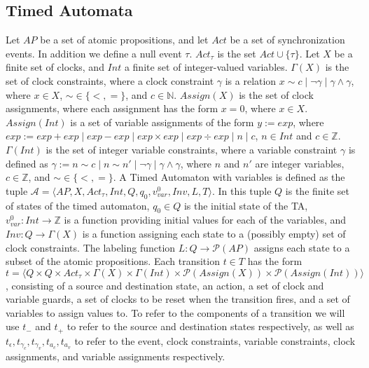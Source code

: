 \documentclass[a4paper,12pt]{article}
\newcommand*\BitOr{\mathbin{|}}
\begin{document}
\subsection{Timed Automata}\label{timed-automata}
Let \(AP\) be a set of atomic propositions, and let \(Act\) be a set of
synchronization events. In addition we define a null event \(\tau\).
\(Act_{\tau}\) is the set \(Act \cup \{\tau\}\). Let \(X\) be a finite set of
clocks, and \(Int\) a finite set of integer-valued variables. \(\Gamma(X)\) is
the set of clock constraints, where a clock constraint \(\gamma\) is a relation
\(x \sim c \BitOr \neg \gamma\BitOr \gamma \land \gamma\), where \(x \in X\),
\(\sim \in \{<,=\}\), and \(c \in \mathbb{N}\). \(Assign(X)\) is the set of
clock assignments, where each assignment has the form \(x {=} 0\), where
\(x \in X\iffalse{,\ c {\in} \mathbb{Z}^+}\fi\). \(Assign(Int)\) is a set of
variable assignments of the form \(y := exp\), where
\(exp := exp + exp\BitOr exp - exp\BitOr exp \times exp\BitOr exp \div exp\BitOr n\BitOr c\),
\(n \in Int\) and \(c \in \mathbb{Z}\). \(\Gamma(Int)\) is the set of integer
variable constraints, where a variable constraint \(\gamma\) is defined as
\(\gamma := n \sim c\BitOr n \sim n'\BitOr \neg \gamma\BitOr \gamma \land \gamma\),
where \(n\) and \(n'\) are integer variables, \(c \in \mathbb{Z}\), and
\(\sim \in \{<,=\}\). A Timed Automaton with variables is defined as the tuple
\(\mathcal{A} = \big \langle AP,X, Act_{\tau}, Int, Q, q_0, v_{var}^0, Inv, L, T \big \rangle\).
In this tuple \(Q\) is the finite set of states of the timed automaton,
\(q_0 \in Q\) is the initial state of the TA,
\(v_{var}^{0} : Int \rightarrow \mathbb{Z}\) is a function providing initial
values for each of the variables, and \(Inv : Q \rightarrow \Gamma(X)\) is a
function assigning each state to a (possibly empty) set of clock constraints.
The labeling function \(L: Q \rightarrow \mathcal{P}(AP)\) assigns each state to
a subset of the atomic propositions. Each transition \(t \in T\) has the form
\(t = \big \langle Q \times Q \times Act_{\tau} \times \Gamma(X) \times \Gamma(Int) \times \mathcal{P}(Assign(X)) \times \mathcal{P}(Assign(Int)) \big \rangle \),
consisting of a source and destination state, an action, a set of clock and
variable guards, a set of clocks to be reset when the transition fires, and a
set of variables to assign values to. To refer to the components of a transition
we will use \(t_-\) and \(t_+\) to refer to the source and destination states
respectively, as well as
\(t_\epsilon, t_{\gamma_c}, t_{\gamma_v}, t_{a_c}, t_{a_v}\) to refer to the
event, clock constraints, variable constraints, clock assignments, and variable
assignments respectively.
\end{document}
